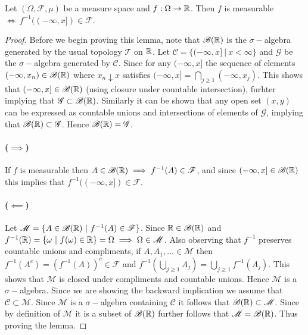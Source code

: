 \begin{lemma}\label{lem:measurable_f}
  Let $(\Omega, \mathscr{F}, \mu)$ be a measure space and $f:\Omega \to \mathbb{R}$. Then $f$ is measurable $\iff\ f^{-1}((-\infty, x]) \in \mathscr{F}$.
\end{lemma}
\begin{proof}
  Before we begin proving this lemma, note that $ \mathscr{B}(\mathbb{R})$ is the $\sigma-$algebra generated by the usual topology $\mathscr{T}$ on $\mathbb{R}$. Let $ \mathscr{C}=\{(-\infty,x]\ |\ x<\infty\}$ and $ \mathscr{G}$ be the $\sigma-$algebra generated by $ \mathscr{C}$. Since for any $(-\infty, x]$ the sequence of elements $(-\infty, x_n) \in \mathscr{B}(\mathbb{R})$ where $x_n \downarrow x$ satisfies $(-\infty,x] = \bigcap_{j\geq 1}(-\infty, x_j)$. This shows that $(-\infty, x]\in \mathscr{B}(\mathbb{R})$ (using closure under countable intersection), furhter implying that $ \mathscr{G}\subset \mathscr{B}(\mathbb{R})$. Similarly it can be shown that any open set $(x,y)$ can be expressed as countable unions and intersections of elements of $ \mathscr{G}$, implying that $ \mathscr{B}(\mathbb{R})\subset \mathscr{G}$. Hence $ \mathscr{B}(\mathbb{R}) = \mathscr{G}$. 
  \paragraph{($\implies $)} If $f$ is measurable then $A\in\mathscr{B}( \mathbb{R})\implies f^{-1}(A) \in \mathscr{F}$, and since $(-\infty, x]\in \mathscr{B}( \mathbb{R})$ this implies that $f^{-1}((-\infty,x])\in \mathscr{F}$.   
  \paragraph{($\impliedby $)} Let $ \mathscr{M} = \{A\in \mathscr{B}(\R)\ |\ f^{-1}(A)\in \mathscr{F}\}$. Since $\mathbb{R} \in \mathscr{B}(\mathbb{R})$ and $f^{-1}(\mathbb{R}) = \{\omega\ |\ f(\omega)\in \mathbb{R} \} = \Omega \implies \Omega \in \mathscr{M}$. Also observing that $f^{-1}$ preserves countable unions and compliments, if $A, A_1,... \in \mathscr{M}$ then $f^{-1}(A^c) = (f^{-1}(A))^c\in \mathscr{F}$ and $f^{-1}(\bigcup_{j\geq1}A_j) = \bigcup_{j\geq 1}f^{-1}(A_j)$. This shows that $ \mathscr{M}$ is closed under compliments and countable unions. Hence $ \mathscr{M}$ is a $\sigma-$algebra. Since we are showing the backward implication we assume that $ \mathscr{C} \subset \mathscr{M}$. Since $ \mathscr{M}$ is a $\sigma-$algebra containing $ \mathscr{C}$ it follows that $ \mathscr{B}(\mathbb{R}) \subset \mathscr{M}$. Since by definition of $ \mathscr{M}$ it is a subset of $ \mathscr{B}(\mathbb{R})$ further follows that $ \mathscr{M} = \mathscr{B}(\mathbb{R})$. Thus proving the lemma.
\end{proof}
